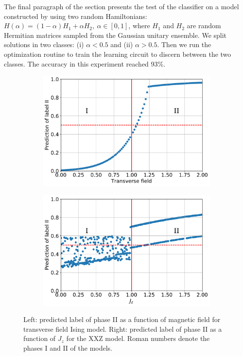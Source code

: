 The final paragraph of the section presents the test of the classifier on a model constructed by using two random Hamiltonians: $H(\alpha) = (1 - \alpha) H_1 + \alpha H_2, \ \alpha \in [0, 1]$, where $H_1$ and $H_2$ are random Hermitian matrices sampled from the Gaussian unitary ensemble. We split solutions in two classes: (i) $\alpha < 0.5$ and (ii) $\alpha > 0.5$. Then we run the optimization routine to train the learning circuit to discern between the two  classes. The accuracy in this experiment reached 93\%.


\begin{figure}
    \centering
    \begin{subfigure}{.48\linewidth}
        \centering
        \includegraphics[width=\textwidth]{../figures/tfi_classification_new_2021}
    \end{subfigure}\begin{subfigure}{.48\linewidth}
        \centering
        \includegraphics[width=\textwidth]{../figures/xxz_classification_new_2021.pdf}
    \end{subfigure}
    \caption{Left: predicted label of phase II as a function of magnetic field for transverse field Ising model. Right: predicted label of phase II as a function of $J_z$ for the XXZ model. Roman numbers denote the phases I and II of the models.}
    \label{fig:phase_classification}
\end{figure}

